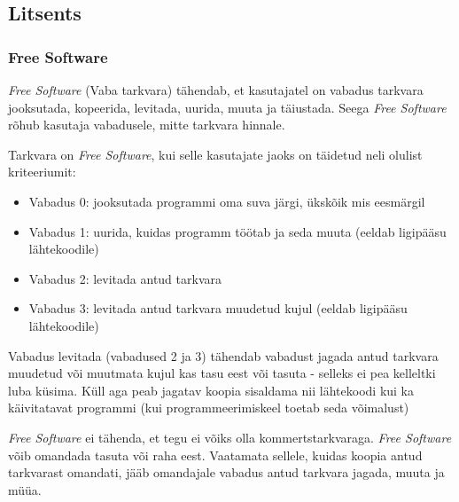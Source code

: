 \documentclass[a4paper,12pt]{article} %
\begin{document}
\subsection{Litsents}
\subsubsection{Free Software}
\textit{Free Software} (Vaba tarkvara) tähendab, et kasutajatel on vabadus tarkvara jooksutada, kopeerida, levitada, uurida, muuta ja täiustada. Seega \textit{Free Software} rõhub kasutaja vabadusele, mitte tarkvara hinnale. \par
Tarkvara on \textit{Free Software}, kui selle kasutajate jaoks on täidetud neli olulist kriteeriumit:
\begin{itemize}
\item Vabadus 0: jooksutada programmi oma suva järgi, ükskõik mis eesmärgil
\item Vabadus 1: uurida, kuidas programm töötab ja seda muuta (eeldab ligipääsu lähtekoodile)
\item Vabadus 2: levitada antud tarkvara
\item Vabadus 3: levitada antud tarkvara muudetud kujul (eeldab ligipääsu lähtekoodile)
\end{itemize}
Vabadus levitada (vabadused 2 ja 3) tähendab vabadust jagada antud tarkvara muudetud või muutmata kujul kas tasu eest või tasuta - selleks ei pea kelleltki luba küsima. Küll aga peab jagatav koopia sisaldama nii lähtekoodi kui ka käivitatavat programmi (kui programmeerimiskeel toetab seda võimalust)\par
\textit{Free Software} ei tähenda, et tegu ei võiks olla kommertstarkvaraga. \textit{Free Software} võib omandada tasuta või raha eest. Vaatamata sellele, kuidas koopia antud tarkvarast omandati,  jääb omandajale vabadus antud tarkvara jagada, muuta ja müüa.
\cite{GNU_Free_SW}
\end{document}
